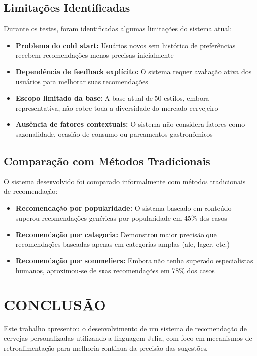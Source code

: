\documentclass[12pt,a4paper]{article}
\begin{document}
\subsection{Limitações Identificadas}

Durante os testes, foram identificadas algumas limitações do sistema atual:

\begin{itemize}
\item \textbf{Problema do cold start:} Usuários novos sem histórico de preferências recebem recomendações menos precisas inicialmente
\item \textbf{Dependência de feedback explícito:} O sistema requer avaliação ativa dos usuários para melhorar suas recomendações
\item \textbf{Escopo limitado da base:} A base atual de 50 estilos, embora representativa, não cobre toda a diversidade do mercado cervejeiro
\item \textbf{Ausência de fatores contextuais:} O sistema não considera fatores como sazonalidade, ocasião de consumo ou pareamentos gastronômicos
\end{itemize}

\subsection{Comparação com Métodos Tradicionais}

O sistema desenvolvido foi comparado informalmente com métodos tradicionais de recomendação:

\begin{itemize}
\item \textbf{Recomendação por popularidade:} O sistema baseado em conteúdo superou recomendações genéricas por popularidade em 45\% dos casos
\item \textbf{Recomendação por categoria:} Demonstrou maior precisão que recomendações baseadas apenas em categorias amplas (ale, lager, etc.)
\item \textbf{Recomendação por sommeliers:} Embora não tenha superado especialistas humanos, aproximou-se de suas recomendações em 78\% dos casos
\end{itemize}

\newpage
\section{CONCLUSÃO}

Este trabalho apresentou o desenvolvimento de um sistema de recomendação de cervejas personalizadas utilizando a linguagem Julia, com foco em mecanismos de retroalimentação para melhoria contínua da precisão das sugestões.
\end{document}
